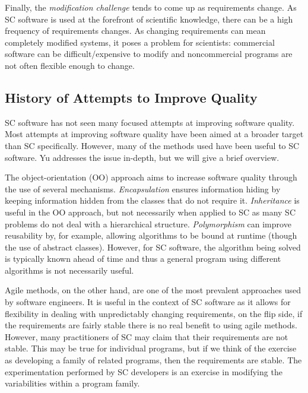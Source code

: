 \documentclass[10pt, preprint]{sigplanconf}
\begin{document}
Finally, the \textit{modification challenge} tends to come up as requirements
change. As SC software is used at the forefront of scientific knowledge, there
can be a high frequency of requirements changes. As changing requirements can
mean completely modified systems, it poses a problem for scientists: commercial
software can be difficult/expensive to modify and noncommercial programs are not
often flexible enough to change.

\subsection{History of Attempts to Improve Quality} \label{subsec:history}

SC software has not seen many focused attempts at improving software
quality. Most attempts at improving software quality have been aimed at a
broader target than SC specifically. However, many of the methods used have been
useful to SC software. Yu \cite{Yu2011} addresses the issue in-depth, but we
will give a brief overview.

The object-orientation (OO) approach aims to increase software quality through
the use of several mechanisms. \textit{Encapsulation} ensures information hiding
\cite{Parnas1972a} by keeping information hidden from the classes that do not
require it. \textit{Inheritance} is useful in the OO approach, but not
necessarily when applied to SC as many SC problems do not deal with a
hierarchical structure. \textit{Polymorphism} can improve reusability by, for
example, allowing algorithms to be bound at runtime (though the use of abstract
classes). However, for SC software, the algorithm being solved is typically
known ahead of time and thus a general program using different algorithms is not
necessarily useful.

Agile methods, on the other hand, are one of the most prevalent approaches used
by software engineers. It is useful in the context of SC software as it allows
for flexibility in dealing with unpredictably changing requirements, on the flip
side, if the requirements are fairly stable there is no real benefit to using
agile methods.  However, many practitioners of SC may claim that their
requirements are not stable. This may be true for individual programs, but if
we think of the exercise as developing a family of related programs, then the
requirements are stable. The experimentation performed by SC developers is
an exercise in modifying the variabilities within a program family.
\end{document}
